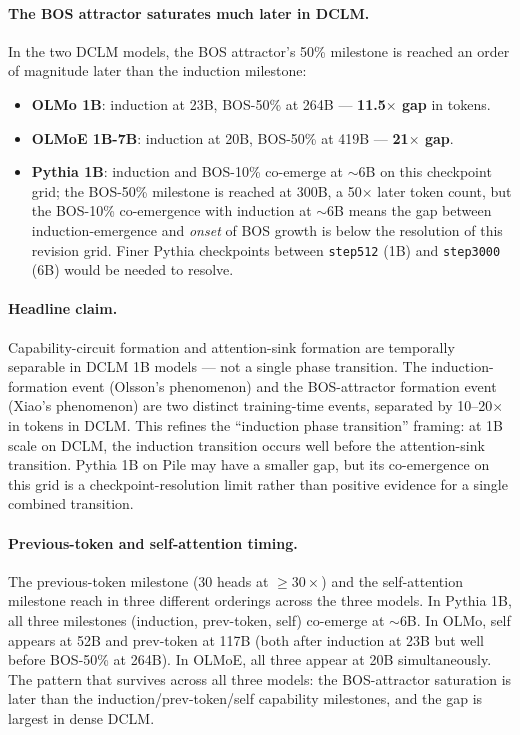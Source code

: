 \documentclass[11pt]{article}
\begin{document}
\paragraph{The BOS attractor saturates much later in DCLM.} In the two
DCLM models, the BOS attractor's 50\% milestone is reached an order of
magnitude later than the induction milestone:
\begin{itemize}
  \item \textbf{OLMo 1B}: induction at 23B, BOS-50\% at 264B ---
        \textbf{11.5$\times$ gap} in tokens.
  \item \textbf{OLMoE 1B-7B}: induction at 20B, BOS-50\% at 419B ---
        \textbf{21$\times$ gap}.
  \item \textbf{Pythia 1B}: induction and BOS-10\% co-emerge at $\sim$6B
        on this checkpoint grid; the BOS-50\% milestone is reached at
        300B, a 50$\times$ later token count, but the BOS-10\% co-emergence
        with induction at $\sim$6B means the gap between
        induction-emergence and \emph{onset} of BOS growth is below the
        resolution of this revision grid. Finer Pythia checkpoints
        between \texttt{step512} (1B) and \texttt{step3000} (6B) would
        be needed to resolve.
\end{itemize}

\paragraph{Headline claim.} Capability-circuit formation and
attention-sink formation are temporally separable in DCLM 1B models ---
not a single phase transition. The induction-formation event (Olsson's
phenomenon) and the BOS-attractor formation event (Xiao's phenomenon) are
two distinct training-time events, separated by 10--20$\times$ in tokens
in DCLM. This refines the ``induction phase transition'' framing: at 1B
scale on DCLM, the induction transition occurs well before the
attention-sink transition. Pythia 1B on Pile may have a smaller gap, but
its co-emergence on this grid is a checkpoint-resolution limit rather than
positive evidence for a single combined transition.

\paragraph{Previous-token and self-attention timing.} The previous-token
milestone (30 heads at $\ge\!30\times$) and the self-attention milestone
reach in three different orderings across the three models. In Pythia 1B,
all three milestones (induction, prev-token, self) co-emerge at $\sim$6B.
In OLMo, self appears at 52B and prev-token at 117B (both after induction
at 23B but well before BOS-50\% at 264B). In OLMoE, all three appear at
20B simultaneously. The pattern that survives across all three models:
the BOS-attractor saturation is later than the
induction/prev-token/self capability milestones, and the gap is largest
in dense DCLM.
\end{document}
